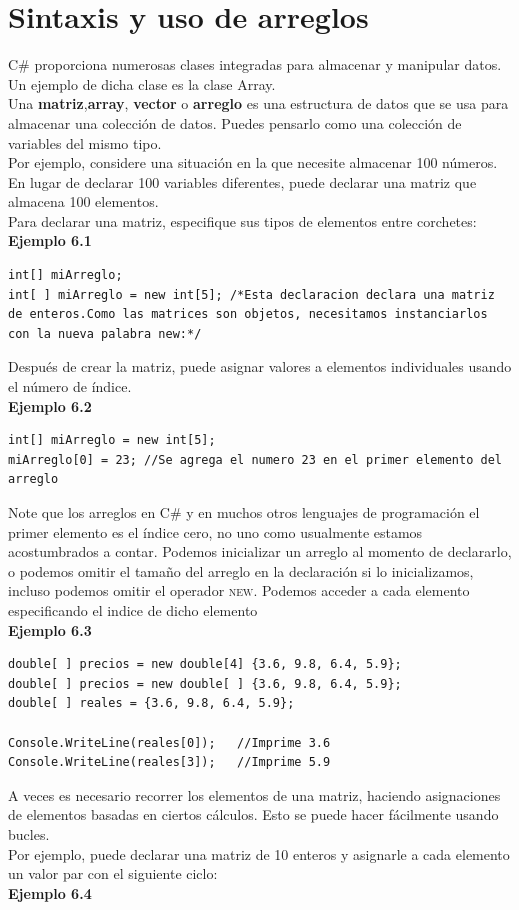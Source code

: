 \documentclass[12pt,a4paper]{report}
\begin{document}
\section{Sintaxis y uso de arreglos}
C\# proporciona numerosas clases integradas para almacenar y manipular datos.
Un ejemplo de dicha clase es la clase Array.\\Una \textbf{matriz},\textbf{array}, \textbf{vector} o \textbf{arreglo} es una estructura de datos que se usa para almacenar una colección de datos. Puedes pensarlo como una colección de variables del mismo tipo.\\Por ejemplo, considere una situación en la que necesite almacenar 100 números. En lugar de declarar 100 variables diferentes, puede declarar una matriz que almacena 100 elementos.\\Para declarar una matriz, especifique sus tipos de elementos entre corchetes:\\\textbf{Ejemplo 6.1}
\begin{lstlisting}
int[] miArreglo;
int[ ] miArreglo = new int[5]; /*Esta declaracion declara una matriz de enteros.Como las matrices son objetos, necesitamos instanciarlos con la nueva palabra new:*/
\end{lstlisting}Después de crear la matriz, puede asignar valores a elementos individuales usando el número de índice.\\\textbf{Ejemplo 6.2}
\begin{lstlisting}
int[] miArreglo = new int[5];
miArreglo[0] = 23; //Se agrega el numero 23 en el primer elemento del arreglo
\end{lstlisting}Note que los arreglos en C\# y en muchos otros lenguajes de programación el primer elemento es el índice cero, no uno como usualmente estamos acostumbrados a contar. Podemos inicializar un arreglo al momento de declararlo, o podemos omitir el tamaño del arreglo en la declaración si lo inicializamos, incluso podemos omitir el operador \textsc{new}. Podemos acceder a cada elemento especificando el indice de dicho elemento\\\textbf{Ejemplo 6.3}
\begin{lstlisting}
double[ ] precios = new double[4] {3.6, 9.8, 6.4, 5.9};
double[ ] precios = new double[ ] {3.6, 9.8, 6.4, 5.9};
double[ ] reales = {3.6, 9.8, 6.4, 5.9};

Console.WriteLine(reales[0]);	//Imprime 3.6
Console.WriteLine(reales[3]);	//Imprime 5.9
\end{lstlisting}A veces es necesario recorrer los elementos de una matriz, haciendo asignaciones de elementos basadas en ciertos cálculos. Esto se puede hacer fácilmente usando bucles.\\Por ejemplo, puede declarar una matriz de 10 enteros y asignarle a cada elemento un valor par con el siguiente ciclo:\\\textbf{Ejemplo 6.4}
\end{document}

